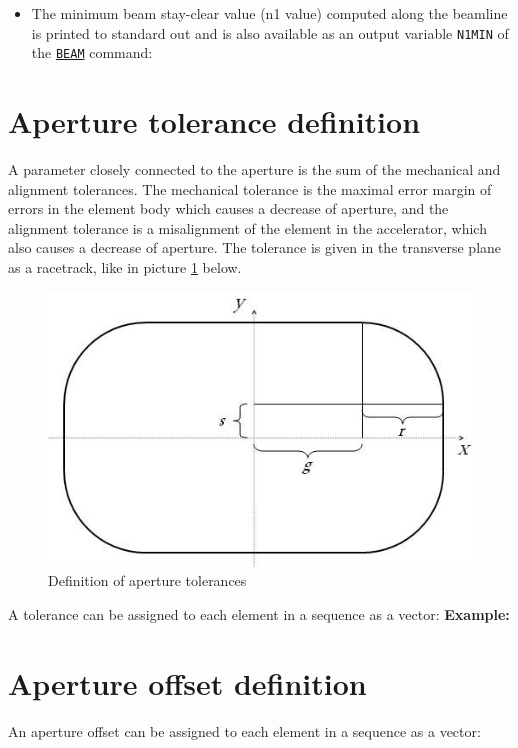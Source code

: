 \begin{itemize}
   \item The minimum beam stay-clear value (n1 value) computed along the 
     beamline is printed to standard out and is also available as an output 
     variable \texttt{N1MIN} of the \hyperref[sec:beam]{\texttt{BEAM}} command: 

\end{itemize}

\section{Aperture tolerance definition}
\label{sec:apertol}
A parameter closely connected to the aperture is the sum of the
mechanical and alignment tolerances. The mechanical tolerance is 
the maximal error margin of errors in the element body which 
causes a decrease of aperture, and the alignment tolerance is a 
misalignment of the element in the accelerator, which also causes a 
decrease of aperture. The tolerance is given in the transverse plane 
as a racetrack, like in picture \ref{fig:aperture-tol} below. 

\begin{figure}[htb]
  \centering
  \includegraphics[width=250bp]{jpg/tolerance.jpg}
  \caption{Definition of aperture tolerances}
  \label{fig:aperture-tol}
\end{figure}

A tolerance can be assigned to each element in a \madx sequence as a vector: 
\textbf{Example:}

\section{Aperture offset definition}
\label{sec:aperoffset}

An aperture offset can be assigned to each element in a \madx sequence as a vector: 

